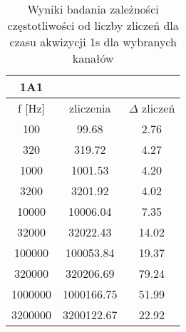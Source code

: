 \begin{table}
        \centering
        \caption{Wyniki badania zależności częstotliwości od liczby zliczeń dla czasu akwizycji 1s dla wybranych kanałów}
        \label{tabela wyniki surowe}
        \begin{multicols}{3}
                \begin{adjustbox}{width=1\linewidth,left}
                \begin{tabular}{|c|c|c|}  
                        \hline 
                        1A1 & & \\ \hline
                        f [Hz] & zliczenia & $\Delta$ zliczeń \\ \hline
                       100 & 99.68 & 2.76\\ \hline 
                       320 & 319.72 & 4.27\\ \hline 
                       1000 & 1001.53 & 4.20\\ \hline 
                       3200 & 3201.92 & 4.02\\ \hline 
                       10000 & 10006.04 & 7.35\\ \hline 
                       32000 & 32022.43 & 14.02\\ \hline 
                       100000 & 100053.84 & 19.37\\ \hline 
                       320000 & 320206.69 & 79.24\\ \hline 
                       1000000 & 1000166.75 & 51.99\\ \hline 
                       3200000 & 3200122.67 & 22.92\\ \hline
               \end{tabular}
               \end{adjustbox}
               \begin{adjustbox}{width=1\linewidth,left}


\end{adjustbox}
\end{multicols}
\end{table}

